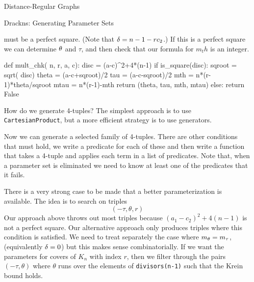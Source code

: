 \begin{chap}{Distance-Regular Graphs}
\begin{sect}{Drackns: Generating Parameter Sets}
\begin{para}
must be a perfect square. (Note that $\delta=n-1-rc_2$.) If this is a perfect square
we can determine $\theta$ and $\tau$, and then check that our formula for $m_th$
is an integer.
\end{para}
%
\begin{sagecode}
\begin{sageinput}
def mult_chk( n, r, a, c):
    disc = (a-c)^2+4*(n-1)
    if is_square(disc):
        sqroot = sqrt( disc)
        theta = (a-c+sqroot)/2
        tau = (a-c-sqroot)/2
        mth = n*(r-1)*theta/sqroot
        mtau = n*(r-1)-mth
        return (theta, tau, mth, mtau)
    else:
        return False
\end{sageinput}
\end{sagecode}
%
\begin{para}
How do we generate 4-tuples? The simplest approach is to use \verb|CartesianProduct|,
but a more efficient strategy is to use generators.
\end{para}
%
\begin{para}
Now we can generate a selected family of 4-tuples. There are other conditions
that must hold, we write a predicate for each of these and then write
a function that takes a 4-tuple and applies each term in a list of
predicates. Note that, when a parameter set is eliminated we need to know
at least one of the predicates that it fails.
\end{para}
%
\begin{para}
There is a very strong case to be made that a better parameterization is available.
The idea is to search on triples
\[
    (-\tau,\theta, r)
\]
Our approach above throws out most triples because $(a_1-c_2)^2+4(n-1)$ is not
a perfect square. Our alternative approach only produces triples where
this condition is satisfied. We need to treat separately the case where
$m_\theta=m_\tau$, (equivalently $\delta=0$) but this makes sense combinatorially. 
If we want the parameters for covers of $K_n$ with index $r$, then we filter
through the pairs $(-\tau, \theta)$ where $\theta$ runs over the elements
of \verb|divisors(n-1)| such that the Krein bound holds.
\end{para}
%
\end{sect}
%
\end{chap}